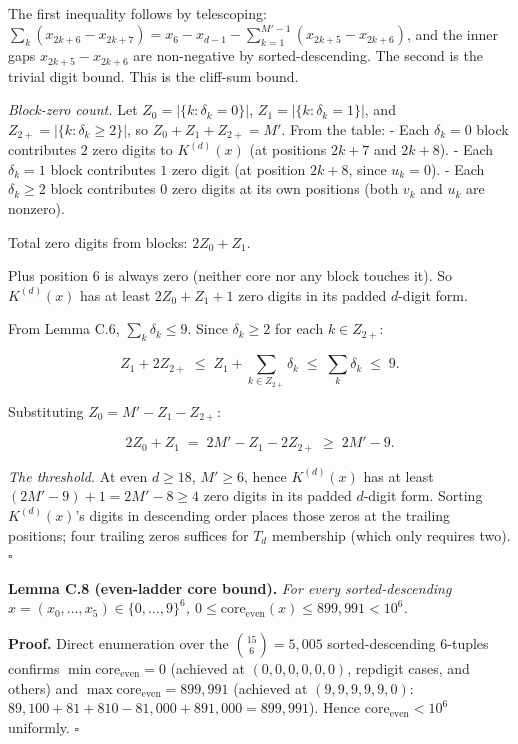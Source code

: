 \documentclass[11pt,letterpaper]{article}
\theoremstyle{paperstyle}
\theoremstyle{paperstyledef}
\theoremstyle{paperstylerem}
\begin{document}
The first inequality follows by telescoping:
\(\sum_k (x_{2k+6} - x_{2k+7}) = x_6 - x_{d-1} - \sum_{k=1}^{M'-1}(x_{2k+5} - x_{2k+6})\),
and the inner gaps \(x_{2k+5} - x_{2k+6}\) are non-negative by
sorted-descending. The second is the trivial digit bound. This is the
cliff-sum bound.

\emph{Block-zero count.} Let \(Z_0 = |\{k : \delta_k = 0\}|\),
\(Z_1 = |\{k : \delta_k = 1\}|\), and
\(Z_{2+} = |\{k : \delta_k \geq 2\}|\), so \(Z_0 + Z_1 + Z_{2+} = M'\).
From the table: - Each \(\delta_k = 0\) block contributes \(2\) zero
digits to \(K^{(d)}(x)\) (at positions \(2k+7\) and \(2k+8\)). - Each
\(\delta_k = 1\) block contributes \(1\) zero digit (at position
\(2k+8\), since \(u_k = 0\)). - Each \(\delta_k \geq 2\) block
contributes \(0\) zero digits at its own positions (both \(v_k\) and
\(u_k\) are nonzero).

Total zero digits from blocks: \(2 Z_0 + Z_1\).

Plus position \(6\) is always zero (neither core nor any block touches
it). So \(K^{(d)}(x)\) has at least \(2 Z_0 + Z_1 + 1\) zero digits in
its padded \(d\)-digit form.

From Lemma C.6, \(\sum_k \delta_k \leq 9\). Since \(\delta_k \geq 2\)
for each \(k \in Z_{2+}\):

\[Z_1 + 2 Z_{2+} \;\leq\; Z_1 + \sum_{k \in Z_{2+}} \delta_k \;\leq\; \sum_k \delta_k \;\leq\; 9.\]

Substituting \(Z_0 = M' - Z_1 - Z_{2+}\):

\[2 Z_0 + Z_1 \;=\; 2 M' - Z_1 - 2 Z_{2+} \;\geq\; 2 M' - 9.\]

\emph{The threshold.} At even \(d \geq 18\), \(M' \geq 6\), hence
\(K^{(d)}(x)\) has at least \((2 M' - 9) + 1 = 2 M' - 8 \geq 4\) zero
digits in its padded \(d\)-digit form. Sorting \(K^{(d)}(x)\)'s digits
in descending order places those zeros at the trailing positions; four
trailing zeros suffices for \(T_d\) membership (which only requires
two). \(\square\)

\textbf{Lemma C.8 (even-ladder core bound).} \emph{For every
sorted-descending \(x = (x_0, \ldots, x_5) \in \{0, \ldots, 9\}^6\),
\(0 \leq \mathrm{core}_{\mathrm{even}}(x) \leq 899{,}991 < 10^6\).}

\textbf{Proof.} Direct enumeration over the \(\binom{15}{6} = 5{,}005\)
sorted-descending 6-tuples confirms
\(\min \mathrm{core}_{\mathrm{even}} = 0\) (achieved at
\((0, 0, 0, 0, 0, 0)\), repdigit cases, and others) and
\(\max \mathrm{core}_{\mathrm{even}} = 899{,}991\) (achieved at
\((9, 9, 9, 9, 9, 0)\):
\(89{,}100 + 81 + 810 - 81{,}000 + 891{,}000 = 899{,}991\)). Hence
\(\mathrm{core}_{\mathrm{even}} < 10^6\) uniformly. \(\square\)
\end{document}
